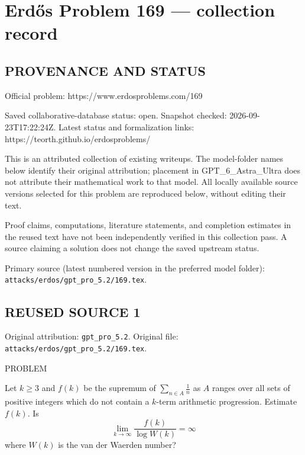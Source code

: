 \section*{Erd\H{o}s Problem 169 --- collection record}

\subsection*{PROVENANCE AND STATUS}
Official problem: https://www.erdosproblems.com/169

Saved collaborative-database status: open.
Snapshot checked: 2026-09-23T17:22:24Z.
Latest status and formalization links: https://teorth.github.io/erdosproblems/

This is an attributed collection of existing writeups. The model-folder names below identify their original attribution; placement in GPT\_6\_Astra\_Ultra does not attribute their mathematical work to that model. All locally available source versions selected for this problem are reproduced below, without editing their text.

Proof claims, computations, literature statements, and completion estimates in the reused text have not been independently verified in this collection pass. A source claiming a solution does not change the saved upstream status.

Primary source (latest numbered version in the preferred model folder): \texttt{attacks/erdos/gpt\_pro\_5.2/169.tex}.

\subsection*{REUSED SOURCE 1}
Original attribution: \texttt{gpt\_pro\_5.2}.
Original file: \texttt{attacks/erdos/gpt\_pro\_5.2/169.tex}.


PROBLEM

Let $k\geq 3$ and $f(k)$ be the supremum of $\sum_{n\in A}\frac{1}{n}$ as $A$ ranges over all sets of positive integers which do not contain a $k$-term arithmetic progression. Estimate $f(k)$. Is
\[\lim_{k\to \infty}\frac{f(k)}{\log W(k)}=\infty\]
where $W(k)$ is the van der Waerden number?

